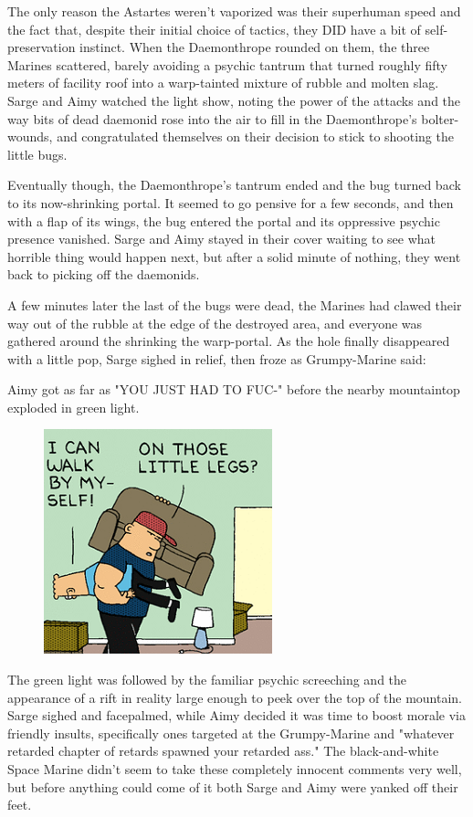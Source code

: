 The only reason the Astartes weren't vaporized was their superhuman speed and the fact that, despite their initial choice of tactics, they DID have a bit of self-preservation instinct. 
When the Daemonthrope rounded on them, the three Marines scattered, barely avoiding a psychic tantrum that turned roughly fifty meters of facility roof into a warp-tainted mixture of rubble and molten slag. 
Sarge and Aimy watched the light show, noting the power of the attacks and the way bits of dead daemonid rose into the air to fill in the Daemonthrope's bolter-wounds, and congratulated themselves on their decision to stick to shooting the little bugs.

Eventually though, the Daemonthrope's tantrum ended and the bug turned back to its now-shrinking portal. 
It seemed to go pensive for a few seconds, and then with a flap of its wings, the bug entered the portal and its oppressive psychic presence vanished. 
Sarge and Aimy stayed in their cover waiting to see what horrible thing would happen next, but after a solid minute of nothing, they went back to picking off the daemonids.

A few minutes later the last of the bugs were dead, the Marines had clawed their way out of the rubble at the edge of the destroyed area, and everyone was gathered around the shrinking the warp-portal. 
As the hole finally disappeared with a little pop, Sarge sighed in relief, then froze as Grumpy-Marine said:



 Aimy got as far as "YOU JUST HAD TO FUC-" before the nearby mountaintop exploded in green light.

\begin{figure}
	\begin{center}
		\includegraphics[width=\figwidth]{pics/16/47.png}
	\end{center}
\end{figure}
The green light was followed by the familiar psychic screeching and the appearance of a rift in reality large enough to peek over the top of the mountain. 
Sarge sighed and facepalmed, while Aimy decided it was time to boost morale via friendly insults, specifically ones targeted at the Grumpy-Marine and "whatever retarded chapter of retards spawned your retarded ass." The black-and-white Space Marine didn't seem to take these completely innocent comments very well, but before anything could come of it both Sarge and Aimy were yanked off their feet.

